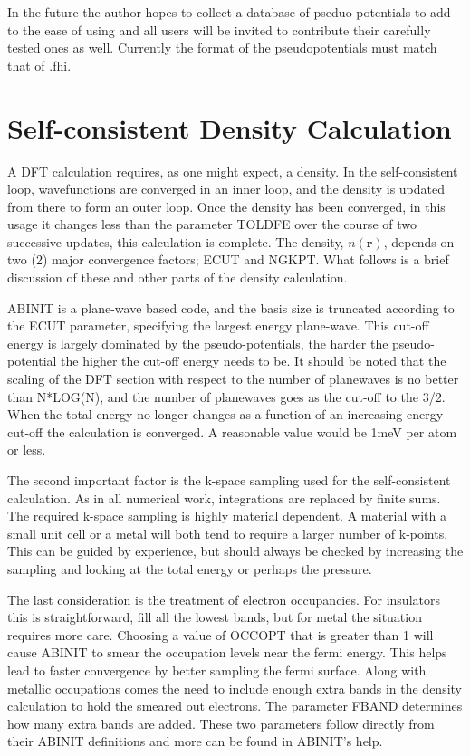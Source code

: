 \documentclass[11pt]{report}
\begin{document}
In the future the author hopes to collect a database of pseduo-potentials to add to the ease of using 
 and all users will be invited to contribute their carefully tested ones as well. Currently the format of the pseudopotentials must
 match that of  .fhi.

\section{Self-consistent Density Calculation}
A DFT calculation requires, as one might expect, a density. In the self-consistent loop, wavefunctions are converged in an inner loop, and the density is updated from there to form an outer loop. Once the density has been converged, in this usage it changes less than the parameter TOLDFE over the course of two successive updates, this calculation is complete. The density, $n(\mathbf{r})$, depends on two (2) major convergence factors; ECUT and NGKPT. What follows is a brief discussion of these and other parts of the density calculation.

ABINIT is a plane-wave based code, and the basis size is truncated according to the ECUT parameter, specifying the largest energy plane-wave. This cut-off energy is largely dominated by the pseudo-potentials, the harder the pseudo-potential the higher the cut-off energy needs to be. It should be noted that the scaling of the DFT section with respect to the number of planewaves is no better than N*LOG(N), and the number of planewaves goes as the cut-off to the 3/2. When the total energy no longer changes as a function of an increasing energy cut-off the calculation is converged. A reasonable value would be 1meV per atom or less.

The second important factor is the k-space sampling used for the self-consistent calculation. As in all numerical work, integrations are replaced by finite sums. The required k-space sampling is highly material dependent. A material with a small unit cell or a metal will both tend to require a larger number of k-points. This can be guided by experience, but should always be checked by increasing the sampling and looking at the total energy or perhaps the pressure. 

The last consideration is the treatment of electron occupancies. For insulators this is straightforward, fill all the lowest bands, but for metal the situation requires more care. Choosing a value of OCCOPT that is greater than 1 will cause ABINIT to smear the occupation levels near the fermi energy. This helps lead to faster convergence by better sampling the fermi surface. Along with metallic occupations comes the need to include enough extra bands in the density calculation to hold the smeared out electrons. The parameter FBAND determines how many extra bands are added. These two parameters follow directly from their ABINIT definitions and more can be found in ABINIT's help.
\end{document}
